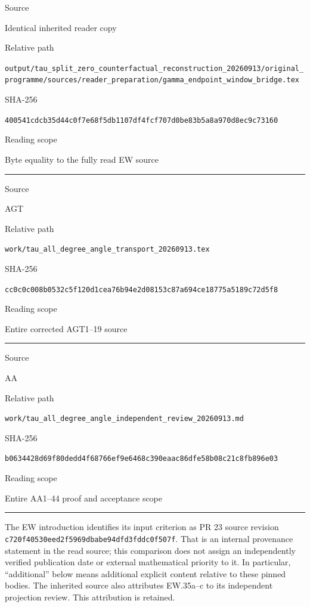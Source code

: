 Source

Identical inherited reader copy

Relative path

{\small\nolinkurl{output/tau_split_zero_counterfactual_reconstruction_20260913/original_programme/sources/reader_preparation/gamma_endpoint_window_bridge.tex}}

SHA-256

\nolinkurl{400541cdcb35d44c0f7e68f5db1107df4fcf707d0be83b5a8a970d8ec9c73160}

Reading scope

Byte equality to the fully read EW source

\begin{center}\rule{0.5\linewidth}{0.5pt}\end{center}

Source

AGT

Relative path

{\small\nolinkurl{work/tau_all_degree_angle_transport_20260913.tex}}

SHA-256

\nolinkurl{cc0c0c008b0532c5f120d1cea76b94e2d08153c87a694ce18775a5189c72d5f8}

Reading scope

Entire corrected AGT1--19 source

\begin{center}\rule{0.5\linewidth}{0.5pt}\end{center}

Source

AA

Relative path

{\small\nolinkurl{work/tau_all_degree_angle_independent_review_20260913.md}}

SHA-256

\nolinkurl{b0634428d69f80dedd4f68766ef9e6468c390eaac86dfe58b08c21c8fb896e03}

Reading scope

Entire AA1--44 proof and acceptance scope

\begin{center}\rule{0.5\linewidth}{0.5pt}\end{center}

The EW introduction identifies its input criterion as PR 23 source revision \nolinkurl{c720f40530eed2f5969dbabe94dfd3fddc0f507f}. That is an internal provenance statement in the read source; this comparison does not assign an independently verified publication date or external mathematical priority to it. In particular, ``additional'' below means additional explicit content relative to these pinned bodies. The inherited source also attributes EW.35a--c to its independent projection review. This attribution is retained.

